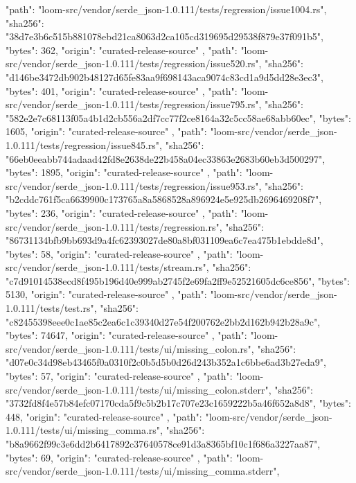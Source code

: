 {    {
      "path": "loom-src/vendor/serde_json-1.0.111/tests/regression/issue1004.rs",
      "sha256": "38d7e3b6c515b881078ebd21ca8063d2ca105cd319695d29538f879e37f091b5",
      "bytes": 362,
      "origin": "curated-release-source"
    },
    {
      "path": "loom-src/vendor/serde_json-1.0.111/tests/regression/issue520.rs",
      "sha256": "d146be3472db902b48127d65fe83aa9f698143aca9074c83cd1a9d5dd28e3ec3",
      "bytes": 401,
      "origin": "curated-release-source"
    },
    {
      "path": "loom-src/vendor/serde_json-1.0.111/tests/regression/issue795.rs",
      "sha256": "582e2e7c68113f05a4b1d2cb556a2df7cc77f2ce8164a32c5cc58ae68abb60ec",
      "bytes": 1605,
      "origin": "curated-release-source"
    },
    {
      "path": "loom-src/vendor/serde_json-1.0.111/tests/regression/issue845.rs",
      "sha256": "66eb0eeabb744adaad42fd8e2638de22b458a04ec33863e2683b60eb3d500297",
      "bytes": 1895,
      "origin": "curated-release-source"
    },
    {
      "path": "loom-src/vendor/serde_json-1.0.111/tests/regression/issue953.rs",
      "sha256": "b2cddc761f5ca6639900c173765a8a5868528a896924e5e925db2696469208f7",
      "bytes": 236,
      "origin": "curated-release-source"
    },
    {
      "path": "loom-src/vendor/serde_json-1.0.111/tests/regression.rs",
      "sha256": "86731134bfb9bb693d9a4fc62393027de80a8bf031109ea6c7ea475b1ebdde8d",
      "bytes": 58,
      "origin": "curated-release-source"
    },
    {
      "path": "loom-src/vendor/serde_json-1.0.111/tests/stream.rs",
      "sha256": "c7d91014538ecd8f495b196d40e999ab2745f2e69fa2ff9e52521605dc6ce856",
      "bytes": 5130,
      "origin": "curated-release-source"
    },
    {
      "path": "loom-src/vendor/serde_json-1.0.111/tests/test.rs",
      "sha256": "c82455398eee0c1ae85c2ea6c1c39340d27e54f200762e2bb2d162b942b28a9c",
      "bytes": 74647,
      "origin": "curated-release-source"
    },
    {
      "path": "loom-src/vendor/serde_json-1.0.111/tests/ui/missing_colon.rs",
      "sha256": "d07e0c34d98eb43465f0a0310f2c0b5d5b0d26d243b352a1c6bbe6ad3b27eda9",
      "bytes": 57,
      "origin": "curated-release-source"
    },
    {
      "path": "loom-src/vendor/serde_json-1.0.111/tests/ui/missing_colon.stderr",
      "sha256": "3732fd8f4e57b84efc07170cda5f9c5b2b17c707e23c1659222b5a46f652a8d8",
      "bytes": 448,
      "origin": "curated-release-source"
    },
    {
      "path": "loom-src/vendor/serde_json-1.0.111/tests/ui/missing_comma.rs",
      "sha256": "b8a9662f99c3e6dd2b6417892c37640578ce91d3a8365bf10c1f686a3227aa87",
      "bytes": 69,
      "origin": "curated-release-source"
    },
    {
      "path": "loom-src/vendor/serde_json-1.0.111/tests/ui/missing_comma.stderr",
}}
